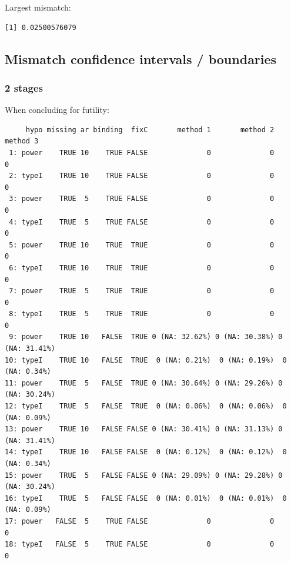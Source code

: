 \documentclass[12pt]{article}
\begin{document}
Largest mismatch:
\begin{verbatim}
[1] 0.02500576079
\end{verbatim}


\clearpage

\subsection{Mismatch confidence intervals / boundaries}
\label{sec:org78dfc93}

\subsubsection{2 stages}
\label{sec:org04e3b8e}

When concluding for futility:
\begin{verbatim}
     hypo missing ar binding  fixC       method 1       method 2       method 3
 1: power    TRUE 10    TRUE FALSE              0              0              0
 2: typeI    TRUE 10    TRUE FALSE              0              0              0
 3: power    TRUE  5    TRUE FALSE              0              0              0
 4: typeI    TRUE  5    TRUE FALSE              0              0              0
 5: power    TRUE 10    TRUE  TRUE              0              0              0
 6: typeI    TRUE 10    TRUE  TRUE              0              0              0
 7: power    TRUE  5    TRUE  TRUE              0              0              0
 8: typeI    TRUE  5    TRUE  TRUE              0              0              0
 9: power    TRUE 10   FALSE  TRUE 0 (NA: 32.62%) 0 (NA: 30.38%) 0 (NA: 31.41%)
10: typeI    TRUE 10   FALSE  TRUE  0 (NA: 0.21%)  0 (NA: 0.19%)  0 (NA: 0.34%)
11: power    TRUE  5   FALSE  TRUE 0 (NA: 30.64%) 0 (NA: 29.26%) 0 (NA: 30.24%)
12: typeI    TRUE  5   FALSE  TRUE  0 (NA: 0.06%)  0 (NA: 0.06%)  0 (NA: 0.09%)
13: power    TRUE 10   FALSE FALSE 0 (NA: 30.41%) 0 (NA: 31.13%) 0 (NA: 31.41%)
14: typeI    TRUE 10   FALSE FALSE  0 (NA: 0.12%)  0 (NA: 0.12%)  0 (NA: 0.34%)
15: power    TRUE  5   FALSE FALSE 0 (NA: 29.09%) 0 (NA: 29.28%) 0 (NA: 30.24%)
16: typeI    TRUE  5   FALSE FALSE  0 (NA: 0.01%)  0 (NA: 0.01%)  0 (NA: 0.09%)
17: power   FALSE  5    TRUE FALSE              0              0              0
18: typeI   FALSE  5    TRUE FALSE              0              0              0
\end{verbatim}
\end{document}
